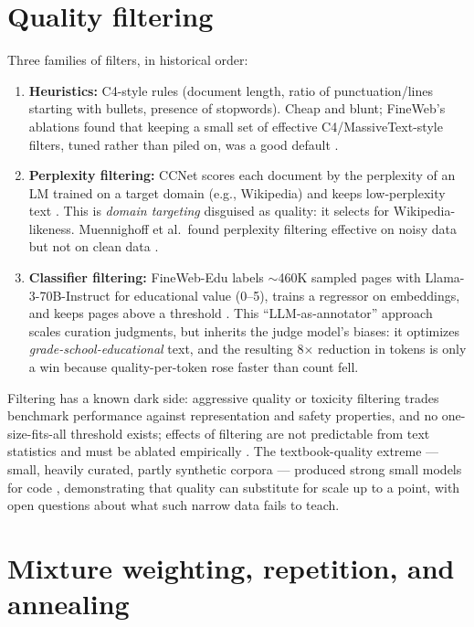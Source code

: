 \documentclass[11pt]{article}
\begin{document}
\section{Quality filtering}
Three families of filters, in historical order:
\begin{enumerate}[noitemsep]
  \item \textbf{Heuristics:} C4-style rules (document length, ratio of punctuation/lines starting with bullets, presence of stopwords). Cheap and blunt; FineWeb's ablations found that keeping a small set of effective C4/MassiveText-style filters, tuned rather than piled on, was a good default \cite{penedo2024fineweb}.
  \item \textbf{Perplexity filtering:} CCNet scores each document by the perplexity of an LM trained on a target domain (e.g., Wikipedia) and keeps low-perplexity text \cite{wenzek2020ccnet}. This is \emph{domain targeting} disguised as quality: it selects for Wikipedia-likeness. Muennighoff et al.\ found perplexity filtering effective on noisy data but not on clean data \cite{muennighoff2023scaling}.
  \item \textbf{Classifier filtering:} FineWeb-Edu labels $\sim$460K sampled pages with Llama-3-70B-Instruct for educational value (0--5), trains a regressor on embeddings, and keeps pages above a threshold \cite{penedo2024fineweb}. This ``LLM-as-annotator'' approach scales curation judgments, but inherits the judge model's biases: it optimizes \emph{grade-school-educational} text, and the resulting 8$\times$ reduction in tokens is only a win because quality-per-token rose faster than count fell.
\end{enumerate}
Filtering has a known dark side: aggressive quality or toxicity filtering trades benchmark performance against representation and safety properties, and no one-size-fits-all threshold exists; effects of filtering are not predictable from text statistics and must be ablated empirically \cite{longpre2023pretrainer}. The textbook-quality extreme --- small, heavily curated, partly synthetic corpora --- produced strong small models for code \cite{gunasekar2023textbooks}, demonstrating that quality can substitute for scale up to a point, with open questions about what such narrow data fails to teach.

\section{Mixture weighting, repetition, and annealing}
\end{document}
